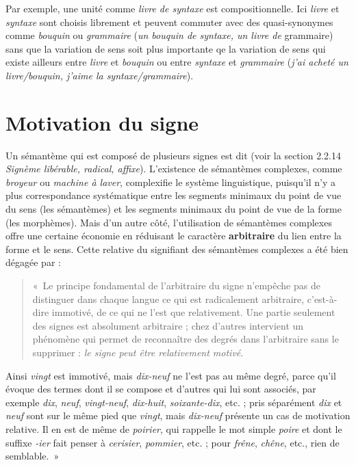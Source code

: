 Par exemple, une unité comme \textit{livre de syntaxe} est compositionnelle. Ici \textit{livre} et \textit{syntaxe} sont choisis librement et peuvent commuter avec des quasi-synonymes comme \textit{bouquin} ou \textit{grammaire} (\textit{un bouquin de syntaxe, un livre de} grammaire) sans que la variation de sens soit plus importante qe la variation de sens qui existe ailleurs entre \textit{livre} et \textit{bouquin} ou entre \textit{syntaxe} et \textit{grammaire} (\textit{j’ai acheté un livre/bouquin, j’aime la syntaxe/grammaire}).

\section{Motivation du signe}\label{sec:2.3.2}

Un sémantème qui est composé de plusieurs signes est dit  (voir la section\textstyleTermesapprofondissement{} 2.2.14 \textit{Signème libérable, radical, affixe}). L’existence de sémantèmes complexes, comme \textit{broyeur} ou \textit{machine à laver}, complexifie le système linguistique, puisqu’il n’y a plus correspondance systématique entre les segments minimaux du point de vue du sens (les sémantèmes) et les segments minimaux du point de vue de la forme (les morphèmes). Mais d’un autre côté, l’utilisation de sémantèmes complexes offre une certaine économie en réduisant le caractère \textbf{arbitraire} du lien entre la forme et le sens. Cette relative  du signifiant des sémantèmes complexes a été bien dégagée par \citet[180]{Saussure1916} :

\begin{quote}
    «~Le principe fondamental de l’arbitraire du signe n’empêche pas de distinguer dans chaque langue ce qui est radicalement arbitraire, c’est-à-dire immotivé, de ce qui ne l’est que relativement. Une partie seulement des signes est absolument arbitraire ; chez d’autres intervient un phénomène qui permet de reconnaître des degrés dans l’arbitraire sans le supprimer : \textit{le signe peut être relativement motivé}.
\end{quote}

Ainsi \textit{vingt} est immotivé, mais \textit{dix-neuf} ne l’est pas au même degré, parce qu’il évoque des termes dont il se compose et d’autres qui lui sont associés, par exemple \textit{dix}, \textit{neuf}, \textit{vingt-neuf}, \textit{dix-huit}, \textit{soixante-dix}, etc. ; pris séparément \textit{dix} et \textit{neuf} sont sur le même pied que \textit{vingt}, mais \textit{dix-neuf} présente un cas de motivation relative. Il en est de même de \textit{poirier}, qui rappelle le mot simple \textit{poire} et dont le suffixe \textit{{}-ier} fait penser à \textit{cerisier}, \textit{pommier}, etc. ; pour \textit{frêne}, \textit{chêne}, etc., rien de semblable.~»

